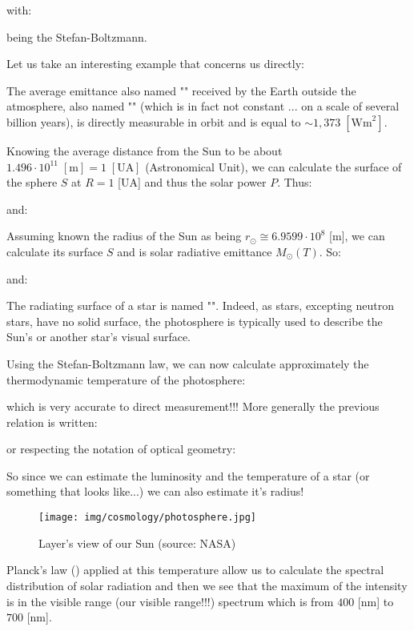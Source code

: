 	with:
	
	being the Stefan-Boltzmann.

	Let us take an interesting example that concerns us directly:
	
	The average emittance also named "" received by the Earth outside the atmosphere, also named "" (which is in fact not constant ... on a scale of several billion years), is directly measurable in orbit and is equal to $\sim 1,373\;[\text{Wm}^2]$.
	
	Knowing the average distance from the Sun to be about $1.496\cdot 10^{11}\;[\text{m}]=1\;[\text{UA}]$  (Astronomical Unit), we can calculate the surface of the sphere $S$ at $R=1$ [UA] and thus the solar power $P$. Thus:
	
	and:
	
	Assuming known the radius of the Sun as being $r_{\odot}\cong 6.9599\cdot 10^8$ [m], we can calculate its surface $S$ and is solar radiative emittance $M_{\odot}(T)$. So:
	
	and:
	
	\begin{tcolorbox}[title=Remark,colframe=black,arc=10pt]
	The radiating surface of a star is named "". Indeed, as stars, excepting neutron stars, have no solid surface, the photosphere is typically used to describe the Sun's or another star's visual surface.
	\end{tcolorbox}
	Using the Stefan-Boltzmann law, we can now calculate approximately the thermodynamic temperature of the photosphere:
	
	which is very accurate to direct measurement!!! More generally the previous relation is written:
	
	or respecting the notation of optical geometry:
	
	So since we can estimate the luminosity and the temperature of a star (or something that looks like...) we can also estimate it's radius!
	\begin{figure}[H]
		\begin{center}
		\texttt{[image: img/cosmology/photosphere.jpg]}
		\end{center}	
		\caption{Layer's view of our Sun (source: NASA)}
	\end{figure}

	Planck's law () applied at this temperature allow us to calculate the spectral distribution of solar radiation and then we see that the maximum of the intensity is in the visible range (our visible range!!!) spectrum which is from $400$ [nm] to $700$ [nm].
	
